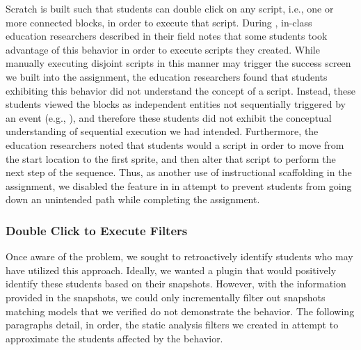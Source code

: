 Scratch is built such that students can double click on any script, i.e., one
or more connected blocks, in order to execute that script. During \sone{},
in-class education researchers described in their field notes that some
students took advantage of this behavior in order to execute scripts they
created. While manually executing disjoint scripts in this manner may trigger
the success screen we built into the assignment, the education researchers
found that students exhibiting this behavior did not understand the concept of
a script. Instead, these students viewed the blocks as independent entities not
sequentially triggered by an event (e.g., \netclicked{}), and therefore these
students did not exhibit the conceptual understanding of sequential execution
we had intended. Furthermore, the education researchers noted that students
would \dce{} a script in order to move from the start location to the first
sprite, and then alter that script to perform the next step of the
sequence. Thus, as another use of instructional scaffolding in the assignment,
we disabled the \dce{} feature in \stwo{} in attempt to prevent students from
going down an unintended path while completing the assignment.

\subsubsection{Double Click to Execute Filters}
Once aware of the problem, we sought to retroactively identify students who may
have utilized this \dce{} approach. Ideally, we wanted a plugin that would
positively identify these students based on their snapshots. However, with the
information provided in the snapshots, we could only incrementally filter out
snapshots matching models that we verified do not demonstrate the \dce{}
behavior. The following paragraphs detail, in order, the static analysis
filters we created in attempt to approximate the students affected by the
\dce{} behavior.

